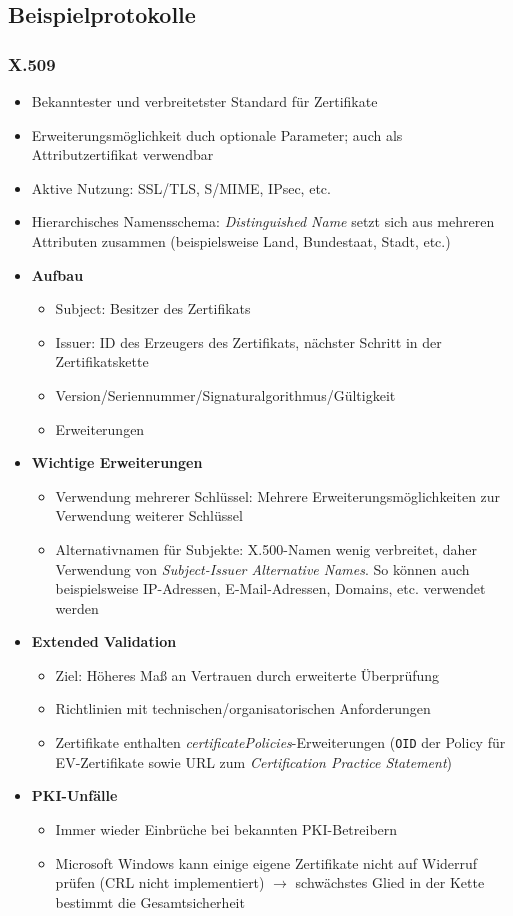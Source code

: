 \subsection{Beispielprotokolle}

\subsubsection{X.509}
\begin{itemize}
	\item Bekanntester und verbreitetster Standard für Zertifikate
	\item Erweiterungsmöglichkeit duch optionale Parameter; auch als Attributzertifikat verwendbar
	\item Aktive Nutzung: SSL/TLS, S/MIME, IPsec, etc.
	\item Hierarchisches Namensschema: \textit{Distinguished Name} setzt sich aus mehreren Attributen zusammen (beispielsweise Land, Bundestaat, Stadt, etc.)
	\item \textbf{Aufbau}
	\begin{itemize}
		\item Subject: Besitzer des Zertifikats
		\item Issuer: ID des Erzeugers des Zertifikats, nächster Schritt in der Zertifikatskette
		\item Version/Seriennummer/Signaturalgorithmus/Gültigkeit
		\item Erweiterungen
	\end{itemize}
	\item \textbf{Wichtige Erweiterungen}
	\begin{itemize}
		\item Verwendung mehrerer Schlüssel: Mehrere Erweiterungsmöglichkeiten zur Verwendung weiterer Schlüssel
		\item Alternativnamen für Subjekte: X.500-Namen wenig verbreitet, daher Verwendung von \textit{Subject-Issuer Alternative Names}. So können auch beispielsweise IP-Adressen, E-Mail-Adressen, Domains, etc. verwendet werden
	\end{itemize}
	\item \textbf{Extended Validation}
	\begin{itemize}
		\item Ziel: Höheres Maß an Vertrauen durch erweiterte Überprüfung
		\item Richtlinien mit technischen/organisatorischen Anforderungen
		\item Zertifikate enthalten \textit{certificatePolicies}-Erweiterungen (\texttt{OID} der Policy für EV-Zertifikate sowie URL zum \textit{Certification Practice Statement})
	\end{itemize}
	\item \textbf{PKI-Unfälle}
	\begin{itemize}
		\item Immer wieder Einbrüche bei bekannten PKI-Betreibern
		\item Microsoft Windows kann einige eigene Zertifikate nicht auf Widerruf prüfen (CRL nicht implementiert) \(\rightarrow\) schwächstes Glied in der Kette bestimmt die Gesamtsicherheit
	\end{itemize}
\end{itemize}

